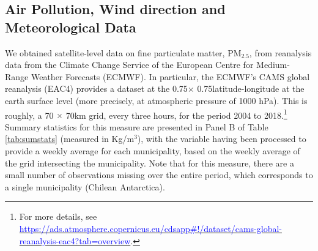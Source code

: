 \documentclass[11pt]{article}
\begin{document}
\begin{spacing}{1.5}
\subsection{Air Pollution, Wind direction and Meteorological Data}
\label{sscn:wind}
We obtained satellite-level data on fine particulate matter, PM$_{2.5}$, from reanalysis data from the Climate Change Service of the European Centre for Medium-Range Weather Forecasts (ECMWF). In particular, the ECMWF's CAMS global reanalysis (EAC4) provides a dataset at the 0.75\textdegree $\times$ 0.75\textdegree latitude-longitude at the earth surface level (more precisely, at atmospheric pressure of 1000 hPa). This is roughly, a 70 $\times$ 70km grid, every three hours, for the period 2004 to 2018.\footnote{For more details, see \hyperlink{https://ads.atmosphere.copernicus.eu/cdsapp\#!/dataset/cams-global-reanalysis-eac4?tab=overview}{\textcolor{blue}{https://ads.atmosphere.copernicus.eu/cdsapp\#!/dataset/cams-global-reanalysis-eac4?tab=overview}}.}  Summary statistics for this measure are presented in Panel B of Table \ref{tab:sumstats} (measured in Kg/m$^3$), with the variable having been processed to provide a weekly average for each municipality, based on the weekly average of the grid intersecting the municipality.  Note that for this measure, there are a small number of observations missing over the entire period, which corresponds to a single municipality (Chilean Antarctica).



\end{spacing}
\end{document}
